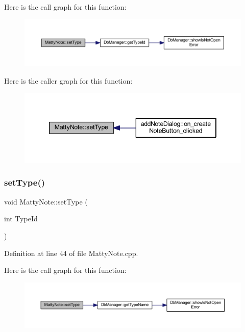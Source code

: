 Here is the call graph for this function\+:
\nopagebreak
\begin{figure}[H]
\begin{center}
\leavevmode
\includegraphics[width=350pt]{classMattyNote_ac9171fd4faaf0c286c9315a0b4ef4560_cgraph}
\end{center}
\end{figure}
Here is the caller graph for this function\+:
\nopagebreak
\begin{figure}[H]
\begin{center}
\leavevmode
\includegraphics[width=346pt]{classMattyNote_ac9171fd4faaf0c286c9315a0b4ef4560_icgraph}
\end{center}
\end{figure}
\hypertarget{classMattyNote_a8ae86d728b9cb64fa78042a09cb5aa70}{}\label{classMattyNote_a8ae86d728b9cb64fa78042a09cb5aa70} 
\subsubsection{\texorpdfstring{set\+Type()}{setType()}\hspace{0.1cm}{\footnotesize\ttfamily [2/2]}}
{\footnotesize\ttfamily void Matty\+Note\+::set\+Type (\begin{DoxyParamCaption}\item[{int}]{Type\+Id }\end{DoxyParamCaption})}



Definition at line 44 of file Matty\+Note.\+cpp.

Here is the call graph for this function\+:
\nopagebreak
\begin{figure}[H]
\begin{center}
\leavevmode
\includegraphics[width=350pt]{classMattyNote_a8ae86d728b9cb64fa78042a09cb5aa70_cgraph}
\end{center}
\end{figure}


